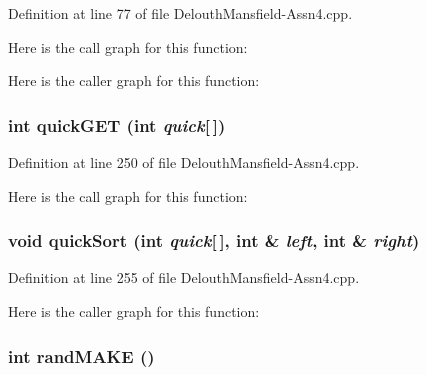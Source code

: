 Definition at line 77 of file DelouthMansfield-\/Assn4.cpp.



Here is the call graph for this function:



Here is the caller graph for this function:

\hypertarget{_delouth_mansfield-_assn4_8cpp_a9c524d18ebb0b180ce26264cf9f01c33}{
\subsubsection[{quickGET}]{\setlength{\rightskip}{0pt plus 5cm}int quickGET (int {\em quick}\mbox{[}$\,$\mbox{]})}}
\label{_delouth_mansfield-_assn4_8cpp_a9c524d18ebb0b180ce26264cf9f01c33}


Definition at line 250 of file DelouthMansfield-\/Assn4.cpp.



Here is the call graph for this function:

\hypertarget{_delouth_mansfield-_assn4_8cpp_a9737d54cba3a8ffec81c622892328116}{
\subsubsection[{quickSort}]{\setlength{\rightskip}{0pt plus 5cm}void quickSort (int {\em quick}\mbox{[}$\,$\mbox{]}, \/  int \& {\em left}, \/  int \& {\em right})}}
\label{_delouth_mansfield-_assn4_8cpp_a9737d54cba3a8ffec81c622892328116}


Definition at line 255 of file DelouthMansfield-\/Assn4.cpp.



Here is the caller graph for this function:

\hypertarget{_delouth_mansfield-_assn4_8cpp_a191743d28b671610e8d78df14b41ed9e}{
\subsubsection[{randMAKE}]{\setlength{\rightskip}{0pt plus 5cm}int randMAKE ()}}
\label{_delouth_mansfield-_assn4_8cpp_a191743d28b671610e8d78df14b41ed9e}


